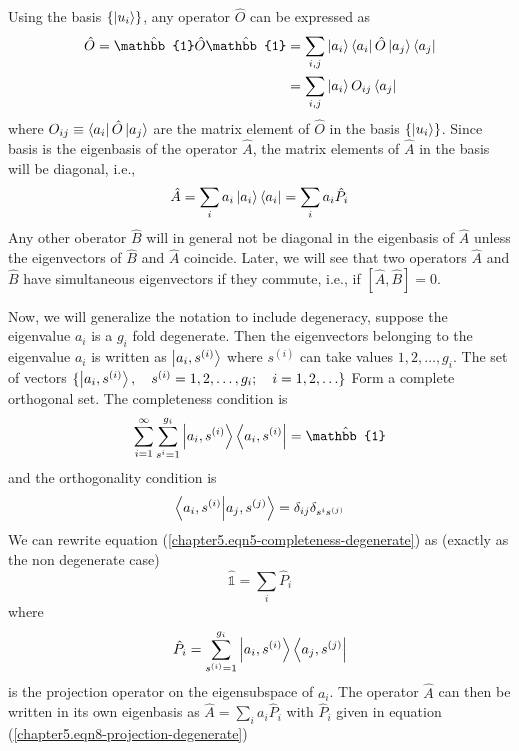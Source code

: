 	Using the basis $\{\ket{u_i}\}$, any operator $\hat{O}$ can be expressed as 
	\begin{eqnarray}
		\hat{O} = \hat{\mathbb{1}} \hat{O} \hat{\mathbb{1}} 
		&= \sum_{i,j} \ket{a_i}\bra{a_i} \hat{O} \ket{a_j}\bra{a_j} \nonumber \\
		&= \sum_{i,j} \ket{a_i} O_{ij} \bra{a_j}
		\label{chapter5.eqn3-operator-as-matrix}
	\end{eqnarray}
	where $O_{ij} \equiv \bra{a_i} \hat{O} \ket{a_j}$ are the matrix element of  $\hat{O}$ in the basis $\{\ket{u_i}\}$. Since basis is the eigenbasis of the operator $\hat{A}$, the matrix elements of $\hat{A}$ in the basis will be diagonal, i.e., 
	\begin{equation}
		\hat{A} = \sum_i a_i \ket{a_i}\bra{a_i} = \sum_i a_i \hat{P}_i
		\label{chapter5.eqn4-diagonalized-operator-projection}
	\end{equation}
	Any other oberator $\hat{B}$ will in general not be diagonal in the eigenbasis of $\hat{A}$ unless the eigenvectors of $\hat{B}$ and $\hat{A}$ coincide. Later, we will see that two operators $\hat{A}$ and $\hat{B}$ have simultaneous eigenvectors if they commute, i.e., if $[\hat{A},\hat{B}]=0$.
	
	
	Now, we will generalize the notation to include degeneracy, suppose the eigenvalue $a_i$ is a $g_i$ fold degenerate. Then the eigenvectors belonging to the eigenvalue $a_i$ is written as $\ket{a_i, s^{(i)}}$ where $s^{(i)}$ can take values $1,2,\ldots, g_i$. The set of vectors $\{\ket{a_i, s^{(i)}}, \quad s^{(i)}=1,2,\ldots,g_i;\quad i=1,2,\ldots\}$ Form a complete orthogonal set. The completeness condition is
	\begin{equation}
		\sum_{i=1}^{\infty} \sum_{s^{i}=1}^{g_i} \ket{a_i, s^{(i)}}\bra{a_i, s^{(i)}} = \hat{\mathbb{1}}
		\label{chapter5.eqn5-completeness-degenerate}
	\end{equation}
	and the orthogonality condition is
	\begin{equation}
		\braket{a_i, s^{(i)}}{a_j, s^{(j)}} = \delta_{ij}\delta_{s^{i}s^{(j)}}
		\label{chapter5.eqn6-orthogonality-degenerate}
	\end{equation}
	We can rewrite equation (\ref{chapter5.eqn5-completeness-degenerate}) as (exactly as the non degenerate case)
	\begin{equation}
		\hat{\mathbb{1}} = \sum_i \hat{P}_i
		\label{chapter5.eqn7-completeness-degenerate-rewrite}
	\end{equation}
	where
	\begin{equation}
		\hat{P}_i = \sum_{s^{(i)}=1}^{g_i} \ket{a_i, s^{(i)}}\bra{a_j, s^{(j)}}
		\label{chapter5.eqn8-projection-degenerate}
	\end{equation}
	is the projection operator on the eigensubspace of $a_i$. The operator $\hat{A}$ can then be written in its own eigenbasis as 
	$\hat{A} = \sum_i a_i \hat{P}_i$ with $\hat{P}_i$ given in equation (\ref{chapter5.eqn8-projection-degenerate})
	
